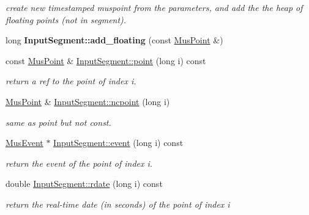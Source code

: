 \begin{DoxyCompactItemize}
\begin{DoxyCompactList}\small\item\em create new timestamped muspoint from the parameters, and add the the heap of floating points (not in segment). \end{DoxyCompactList}\item 
\mbox{\label{group__segment_gabb9443e79fcefd19a5c7b65c4e54102a}} 
long {\bfseries Input\+Segment\+::add\+\_\+floating} (const \mbox{\hyperlink{classMusPoint}{Mus\+Point}} \&)
\item 
const \mbox{\hyperlink{classMusPoint}{Mus\+Point}} \& \mbox{\hyperlink{group__segment_ga5463f900db31be4b7d109e88a710971f}{Input\+Segment\+::point}} (long i) const
\begin{DoxyCompactList}\small\item\em return a ref to the point of index i. \end{DoxyCompactList}\item 
\mbox{\label{group__segment_ga2dbfcbf9664a10c1245e298b9257d5cd}} 
\mbox{\hyperlink{classMusPoint}{Mus\+Point}} \& \mbox{\hyperlink{group__segment_ga2dbfcbf9664a10c1245e298b9257d5cd}{Input\+Segment\+::ncpoint}} (long i)
\begin{DoxyCompactList}\small\item\em same as point but not const. \end{DoxyCompactList}\item 
\mbox{\label{group__segment_gafaa215f8df4e03b3e22c4c5eb3e494ca}} 
\mbox{\hyperlink{classMusEvent}{Mus\+Event}} $\ast$ \mbox{\hyperlink{group__segment_gafaa215f8df4e03b3e22c4c5eb3e494ca}{Input\+Segment\+::event}} (long i) const
\begin{DoxyCompactList}\small\item\em return the event of the point of index i. \end{DoxyCompactList}\item 
\mbox{\label{group__segment_ga7c26187b3e70ea62bd10b9b15284a99a}} 
double \mbox{\hyperlink{group__segment_ga7c26187b3e70ea62bd10b9b15284a99a}{Input\+Segment\+::rdate}} (long i) const
\begin{DoxyCompactList}\small\item\em return the real-\/time date (in seconds) of the point of index i \end{DoxyCompactList}\item 

\end{DoxyCompactItemize}
